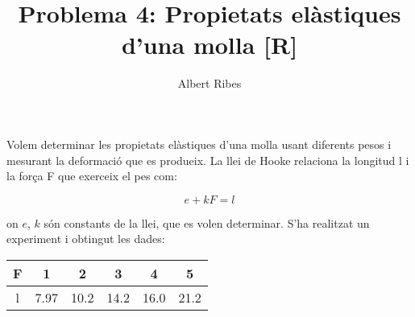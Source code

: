 \documentclass[a4paper]{article}
\author{Albert Ribes}
\title{Problema 4: Propietats elàstiques d'una molla [R]}
\begin{document}
\maketitle
Volem determinar les propietats elàstiques d'una molla usant diferents pesos i mesurant la deformació
que es produeix. La llei de Hooke relaciona la longitud l i la força F que exerceix el pes com:

\begin{equation*}
e + kF = l
\end{equation*}

on $e$, $k$ són constants de la llei, que es volen determinar. S'ha realitzat un experiment i obtingut les
dades:

\begin{center}
\begin{tabular}{c c c c c c}
  F & 1 & 2 & 3 & 4 & 5 \\
  \hline
  l & 7.97 & 10.2 & 14.2 & 16.0 & 21.2 \\
\end{tabular}
\end{center}
\end{document}
